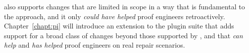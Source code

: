 \sysname also supports changes that are limited in scope in a way that is fundamental to the approach,
and it only \textit{could have helped} proof engineers retroactively.
Chapter~\ref{chapt:pi} will introduce an extension to the \sysnamelong plugin suite that
adds support for a broad class of changes beyond those supported by \sysname,
and that \textit{can help} and \textit{has helped} proof engineers on real repair scenarios.
















